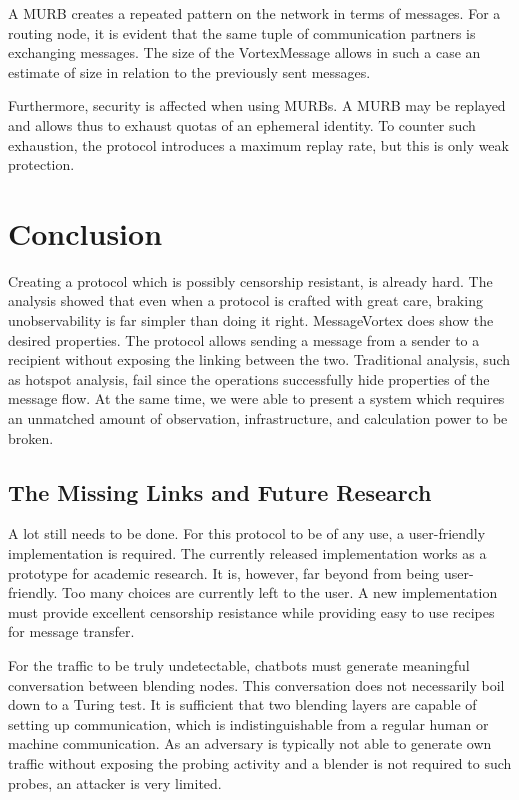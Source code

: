 \documentclass[10pt,journal,compsoc]{IEEEtran}
\begin{document}
A MURB creates a repeated pattern on the network in terms of messages. For a routing node, it is evident that the same tuple of communication partners is exchanging messages. The size of the VortexMessage allows in such a case an estimate of size in relation to the previously sent messages.

Furthermore, security is affected when using MURBs. A MURB may be replayed and allows thus to exhaust quotas of an ephemeral identity. To counter such exhaustion, the protocol introduces a maximum replay rate, but this is only weak protection.

\section{Conclusion}
Creating a protocol which is possibly censorship resistant, is already hard. The analysis showed that even when a protocol is crafted with great care, braking unobservability is far simpler than doing it right. MessageVortex does show the desired properties. The protocol allows sending a message from a sender to a recipient without exposing the linking between the two. Traditional analysis, such as hotspot analysis, fail since the operations successfully hide properties of the message flow. At the same time, we were able to present a system which requires an unmatched amount of observation, infrastructure, and calculation power to be broken.

\subsection{The Missing Links and Future Research}
A lot still needs to be done. For this protocol to be of any use, a user-friendly implementation is required. The currently released implementation works as a prototype for academic research. It is, however, far beyond from being user-friendly. Too many choices are currently left to the user. A new implementation must provide excellent censorship resistance while providing easy to use recipes for message transfer.  

For the traffic to be truly undetectable, chatbots must generate meaningful conversation between blending nodes. This conversation does not necessarily boil down to a Turing test. It is sufficient that two blending layers are capable of setting up communication, which is indistinguishable from a regular human or machine communication. As an adversary is typically not able to generate own traffic without exposing the probing activity and a blender is not required to such probes, an attacker is very limited.
\end{document}
